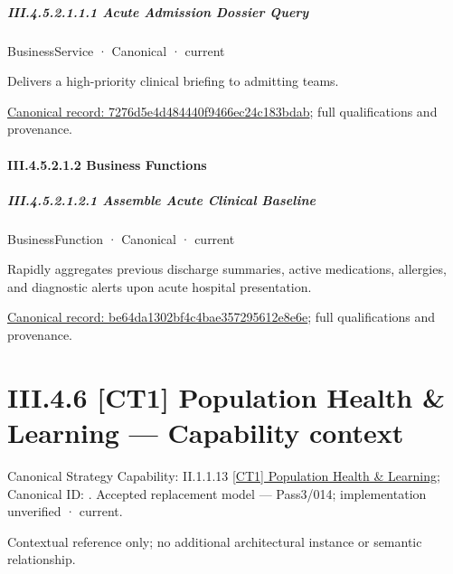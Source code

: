 \subparagraph*{III.4.5.2.1.1.1 Acute Admission Dossier Query}
\label{navigation:III.4.5.2.1.1.1}

\label{element:7276d5e4d484440f9466ec24c183bdab}
{\small BusinessService · Canonical · current}\par

Delivers a high-priority clinical briefing to admitting teams.


{\footnotesize \href{../../../../continuum/business/business-service/7276d5e4d484440f9466ec24c183bdab.md}{Canonical record: 7276d5e4d484440f9466ec24c183bdab}; full qualifications and provenance.}\par
\paragraph*{III.4.5.2.1.2 Business Functions}
\label{navigation:III.4.5.2.1.2}

\subparagraph*{III.4.5.2.1.2.1 Assemble Acute Clinical Baseline}
\label{navigation:III.4.5.2.1.2.1}

\label{element:be64da1302bf4c4bae357295612e8e6e}
{\small BusinessFunction · Canonical · current}\par

Rapidly aggregates previous discharge summaries, active medications, allergies, and diagnostic alerts upon acute hospital presentation.


{\footnotesize \href{../../../../continuum/business/business-function/be64da1302bf4c4bae357295612e8e6e.md}{Canonical record: be64da1302bf4c4bae357295612e8e6e}; full qualifications and provenance.}\par
\section*{III.4.6 [CT1] Population Health \& Learning — Capability context}
\label{navigation:III.4.6}

{\small Canonical Strategy Capability: II.1.1.13 \hyperref[element:171474082c704543b2e57fe37c9797ec]{[CT1] Population Health \& Learning}; Canonical ID: \texttt{}. Accepted replacement model — Pass3/014; implementation unverified · current.}\par
Contextual reference only; no additional architectural instance or semantic relationship.\par
